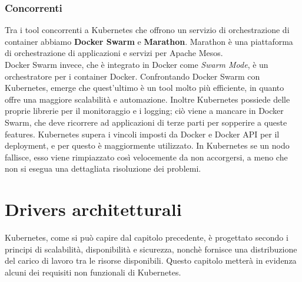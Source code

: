 \documentclass[12pt, a4paper]{report}
\begin{document}
\subsection{Concorrenti}
Tra i tool concorrenti a Kubernetes che offrono un servizio di orchestrazione di container abbiamo \textbf{Docker Swarm} e \textbf{Marathon}. Marathon è una piattaforma di orchestrazione di applicazioni e servizi per Apache Mesos.\\
Docker Swarm invece, che è integrato in Docker come \textit{Swarm Mode}, è un orchestratore per i container Docker. Confrontando Docker Swarm con Kubernetes, emerge che quest'ultimo è un tool molto più efficiente, in quanto offre una maggiore scalabilità e automazione. Inoltre Kubernetes possiede delle proprie librerie per il monitoraggio e i logging; ciò viene a mancare in Docker Swarm, che deve ricorrere ad applicazioni di terze parti per sopperire a queste features.
Kubernetes supera i vincoli imposti da Docker e Docker API per il deployment, e per questo è maggiormente utilizzato. In Kubernetes se un nodo fallisce, esso viene rimpiazzato così velocemente da non accorgersi, a meno che non si esegua una dettagliata risoluzione dei problemi.
\chapter{Drivers architetturali}
Kubernetes, come si può capire dal capitolo precedente, è progettato secondo i principi di scalabilità, disponibilità e sicurezza, nonchè fornisce una distribuzione del carico di lavoro tra le risorse disponibili. Questo capitolo metterà in evidenza alcuni dei requisiti non funzionali di Kubernetes.
\end{document}
